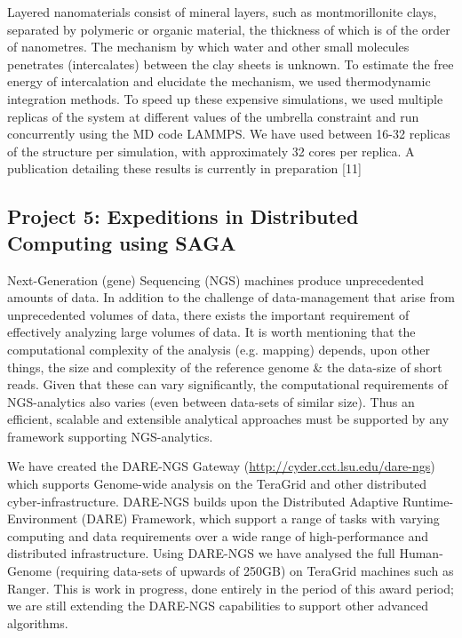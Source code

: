 \documentclass[a4paper,10pt]{article}
\begin{document}
Layered nanomaterials consist of mineral layers, such as montmorillonite clays, separated by polymeric or organic material, the thickness of which is of the order of nanometres. The mechanism by which water and other small molecules penetrates (intercalates) between the clay sheets is unknown. To estimate the free energy of intercalation and elucidate the mechanism, we used thermodynamic integration methods. To speed up these expensive simulations, we used multiple replicas of the system at different values of the umbrella constraint and run concurrently using the MD code LAMMPS. We have used between 16-32 replicas of the structure per simulation, with approximately 32 cores per replica. A publication detailing these results is currently in preparation [11]

\subsection{Project 5: Expeditions in Distributed Computing using SAGA}

Next-Generation (gene) Sequencing (NGS) machines produce unprecedented amounts of data.  In addition to the challenge of data-management that arise from unprecedented volumes of data, there exists the important requirement of effectively analyzing large volumes of data.  It is worth mentioning that the computational complexity of the analysis (e.g. mapping) depends, upon other things, the size and complexity of the reference genome \& the data-size of short reads.  Given that these can vary significantly, the computational requirements of NGS-analytics also varies (even between data-sets of similar size).  Thus an efficient, scalable and extensible analytical approaches must be supported by any framework supporting NGS-analytics.

We have created the DARE-NGS Gateway (\url{http://cyder.cct.lsu.edu/dare-ngs}) which supports Genome-wide analysis on the TeraGrid and other distributed cyber-infrastructure.  DARE-NGS builds upon the Distributed Adaptive Runtime-Environment (DARE) Framework, which support a range of tasks with varying computing and data requirements over a wide range of high-performance and distributed infrastructure.  Using DARE-NGS we have analysed the full Human-Genome (requiring data-sets of upwards of 250GB) on TeraGrid machines such as Ranger. This is work in progress, done entirely in the period of this award period; we are still extending the DARE-NGS capabilities to support other advanced algorithms\cite{ecmls11}.
\end{document}
